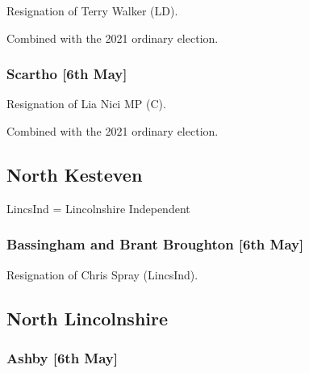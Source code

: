 \documentclass[a4paper,openany]{book}
\begin{document}
\begin{resultsiii}

Resignation of Terry Walker (LD).

Combined with the 2021 ordinary election.

\subsubsection*{Scartho \hspace*{\fill}\nolinebreak[1]%
	\enspace\hspace*{\fill}
	[6th May]}


Resignation of Lia Nici MP (C).

Combined with the 2021 ordinary election.

\subsection*{North Kesteven}

LincsInd = Lincolnshire Independent

\subsubsection*{Bassingham and Brant Broughton \hspace*{\fill}\nolinebreak[1]%
	\enspace\hspace*{\fill}
	[6th May]}


Resignation of Chris Spray (LincsInd).

\subsection*{North Lincolnshire}

\subsubsection*{Ashby \hspace*{\fill}\nolinebreak[1]%
	\enspace\hspace*{\fill}
	[6th May]}



\end{resultsiii}
\end{document}
